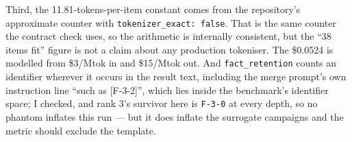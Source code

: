 \documentclass[11pt]{article}
\begin{document}
Third, the 11.81-tokens-per-item constant comes from the repository's approximate counter
with \texttt{tokenizer\_exact: false}. That is the same counter the contract check uses, so
the arithmetic is internally consistent, but the ``38 items fit'' figure is not a claim
about any production tokeniser. The \$0.0524 is modelled from \$3/Mtok in and \$15/Mtok
out. And \texttt{fact\_retention} counts an identifier wherever it occurs in the result
text, including the merge prompt's own instruction line ``such as [F-3-2]'', which lies
inside the benchmark's identifier space; I checked, and rank 3's survivor here is
\texttt{F-3-0} at every depth, so no phantom inflates this run --- but it does inflate the
surrogate campaigns and the metric should exclude the template.
\end{document}
